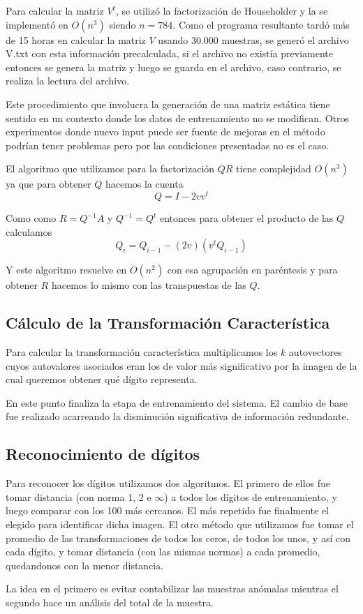 Para calcular la matriz $V^t$, se utiliz\'o la factorizaci\'on de Householder y la se implement\'o en $O(n^3)$
siendo $n = 784$. Como el programa resultante tard\'o m\'as de 15 horas en calcular la matriz $V$ usando 30.000 muestras,
se gener\'o el archivo V.txt con esta informaci\'on precalculada, si el archivo no exist\'ia previamente
entonces se genera la matriz y luego se guarda en el archivo, caso contrario, se realiza la lectura del archivo.

Este procedimiento que involucra la generaci\'on de una matriz est\'atica tiene sentido en un contexto
donde los datos de entrenamiento no se modifican. Otros experimentos donde nuevo input puede ser fuente de mejoras
en el m\'etodo podr\'ian tener problemas pero por las condiciones presentadas no es el caso.

El algoritmo que utilizamos para la factorizaci\'on $QR$ tiene complejidad $O(n^3)$ ya que para obtener $Q$ hacemos la cuenta
$$Q = I - 2vv^t$$

Como como $R = Q^{-1}A$ y $Q^{-1} = Q^t$ entonces para obtener el producto de
las $Q$ calculamos
$$Q_i = Q_{i-1} - (2v)(v^t Q_{i-1})$$

Y este algoritmo resuelve en $O(n^2)$ con esa agrupaci\'on en par\'entesis y para 
obtener $R$ hacemos lo mismo con las transpuestas de las $Q$.

\subsection{C\'alculo de la Transformaci\'on Caracter\'istica}

Para calcular la transformaci\'on caracter\'istica multiplicamos los $k$
autovectores cuyos autovalores asociados eran los de valor m\'as significativo
por la imagen de la cual queremos obtener qu\'e d\'igito representa.

En este punto finaliza la etapa de entrenamiento del sistema. El cambio de base
fue realizado acarreando la disminuci\'on significativa de informaci\'on
redundante.

\subsection{Reconocimiento de d\'igitos}
Para reconocer los d\'igitos utilizamos dos algoritmos. El primero de ellos fue tomar distancia (con norma 1, 2 e $\infty$) a
todos los d\'igitos de entrenamiento, y luego comparar con los 100 m\'as cercanos. El m\'as repetido fue finalmente
el elegido para identificar dicha imagen. El otro m\'etodo que utilizamos fue tomar el promedio de las transformaciones
de todos los ceros, de todos los unos, y as\'i con cada d\'igito, y tomar distancia (con las mismas normas)
a cada promedio, quedandonos con la menor distancia.

La idea en el primero es evitar contabilizar las muestras an\'omalas mientras el
segundo hace un an\'alisis del total de la muestra.
